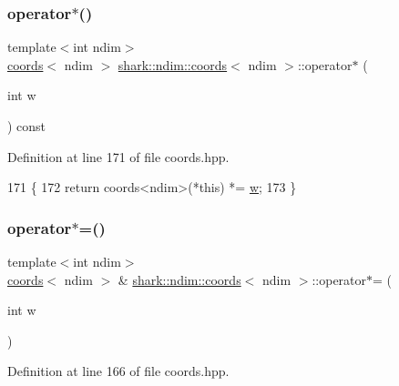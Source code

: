 \subsubsection{\texorpdfstring{operator$\ast$()}{operator*()}}
{\footnotesize\ttfamily template$<$int ndim$>$ \\
\hyperlink{structshark_1_1ndim_1_1coords}{coords}$<$ ndim $>$ \hyperlink{structshark_1_1ndim_1_1coords}{shark\+::ndim\+::coords}$<$ ndim $>$\+::operator$\ast$ (\begin{DoxyParamCaption}\item[{int}]{w }\end{DoxyParamCaption}) const\hspace{0.3cm}{\ttfamily [inline]}}



Definition at line 171 of file coords.\+hpp.


\begin{DoxyCode}
171                                                                \{
172             \textcolor{keywordflow}{return} coords<ndim>(*this) *= \hyperlink{classshark_1_1_group_af542c8e71a81c12d6a73203ef9152d1f}{w};
173         \}
\end{DoxyCode}
\hypertarget{structshark_1_1ndim_1_1coords_a21edb6ede1b21a35135d016269a8a96f}{}\label{structshark_1_1ndim_1_1coords_a21edb6ede1b21a35135d016269a8a96f} 
\subsubsection{\texorpdfstring{operator$\ast$=()}{operator*=()}}
{\footnotesize\ttfamily template$<$int ndim$>$ \\
\hyperlink{structshark_1_1ndim_1_1coords}{coords}$<$ ndim $>$ \& \hyperlink{structshark_1_1ndim_1_1coords}{shark\+::ndim\+::coords}$<$ ndim $>$\+::operator$\ast$= (\begin{DoxyParamCaption}\item[{int}]{w }\end{DoxyParamCaption})\hspace{0.3cm}{\ttfamily [inline]}}



Definition at line 166 of file coords.\+hpp.


